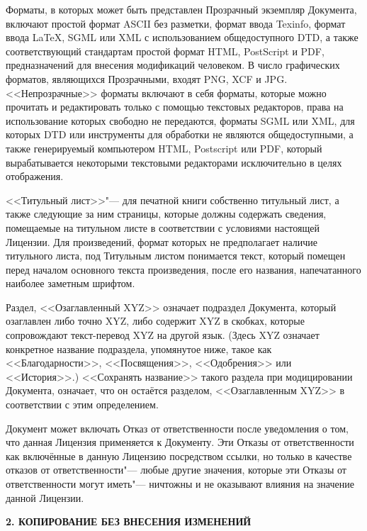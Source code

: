 Форматы, в которых может быть представлен Прозрачный экземпляр Документа,
включают простой формат ASCII без разметки, формат ввода Texinfo, формат
ввода LaTeX, SGML или XML с использованием общедоступного DTD, а также
соответствующий стандартам простой формат HTML, PostScript и PDF,
предназначений для внесения модификаций человеком. В число графических
форматов, являющихся Прозрачными, входят PNG, XCF и JPG. <<Непрозрачные>>
форматы включают в себя форматы, которые можно прочитать и редактировать
только с помощью текстовых редакторов, права на использование которых
свободно не передаются, форматы SGML или XML, для которых DTD или
инструменты для обработки не являются общедоступными, а также
генерируемый компьютером HTML, Postscript или PDF, который вырабатывается
некоторыми текстовыми редакторами исключительно в целях отображения.

<<Титульный лист>>"--- для печатной книги собственно титульный лист, а
также следующие за ним страницы, которые должны содержать сведения,
помещаемые на титульном листе в соответствии с условиями настоящей
Лицензии. Для произведений, формат которых не предполагает наличие
титульного листа, под Титульным листом понимается текст, который помещен
перед началом основного текста произведения, после его названия,
напечатанного наиболее заметным шрифтом.

Раздел, <<Озаглавленный XYZ>> означает подраздел Документа, который
озаглавлен либо точно XYZ, либо содержит XYZ в скобках, которые
сопровождают текст-перевод XYZ на другой язык. (Здесь XYZ означает
конкретное название подраздела, упомянутое ниже, такое как
<<Благодарности>>, <<Посвящения>>, <<Одобрения>> или <<История>>.)
<<Сохранять название>> такого раздела при модицировании Документа,
означает, что он остаётся разделом, <<Озаглавленным XYZ>> в соответствии
с этим определением.

Документ может включать Отказ от ответственности после уведомления о
том, что данная Лицензия применяется к Документу. Эти Отказы от
ответственности как включённые в данную Лицензию посредством ссылки, но
только в качестве отказов от ответственности"--- любые другие значения,
которые эти Отказы от ответственности могут иметь"--- ничтожны и не
оказывают влияния на значение данной Лицензии.


\begin{center}
{\Large\bf 2. КОПИРОВАНИЕ БЕЗ ВНЕСЕНИЯ ИЗМЕНЕНИЙ\par}
\end{center}

